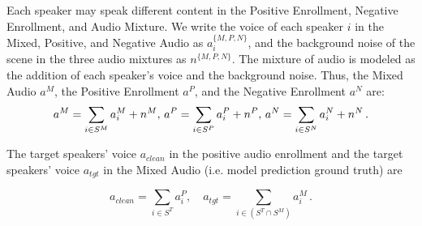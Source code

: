Each speaker may speak different content in the Positive Enrollment, Negative Enrollment, and Audio Mixture. We write the voice of each speaker $i$ in the Mixed, Positive, and Negative Audio as $a^{\{M, P, N\}}_i$, and the background noise of the scene in the three audio mixtures as $n^{\{M, P, N\}}$. The mixture of audio is modeled as the addition of each speaker's voice and the background noise. Thus, the Mixed Audio $a^M$, the Positive Enrollment $a^P$, and the Negative Enrollment $a^N$ are: 
\begin{equation}\scriptsize
a^M = \sum_{i \in S^M} a^M_i + n^M, \,
a^P = \sum_{i \in S^P} a^P_i + n^P ,\, 
a^N = \sum_{i \in S^N} a^N_i + n^N \,.
\end{equation}

The target speakers' voice $a_{clean}$ in the positive audio enrollment and the target speakers' voice $a_{tgt}$ in the Mixed Audio (i.e. model prediction ground truth) are

\begin{equation}
a_{clean} = \sum_{i \in S^T} a^P_i , \quad a_{tgt} = \sum_{i \in (S^T \cap S^M)} a^M_i \,.
\end{equation}








